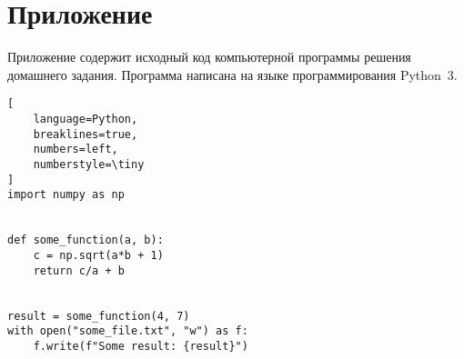 \documentclass[../homework.tex]{subfiles}
\begin{document}
\newpage

\section{\centering Приложение}

Приложение содержит исходный код компьютерной программы решения домашнего задания.
Программа написана на языке программирования Python~3.

\footnotesize

\begin{lstlisting}[
    language=Python,
    breaklines=true,
    numbers=left,
    numberstyle=\tiny
]
import numpy as np


def some_function(a, b):
    c = np.sqrt(a*b + 1)
    return c/a + b


result = some_function(4, 7)
with open("some_file.txt", "w") as f:
    f.write(f"Some result: {result}")

\end{lstlisting}
\end{document}

